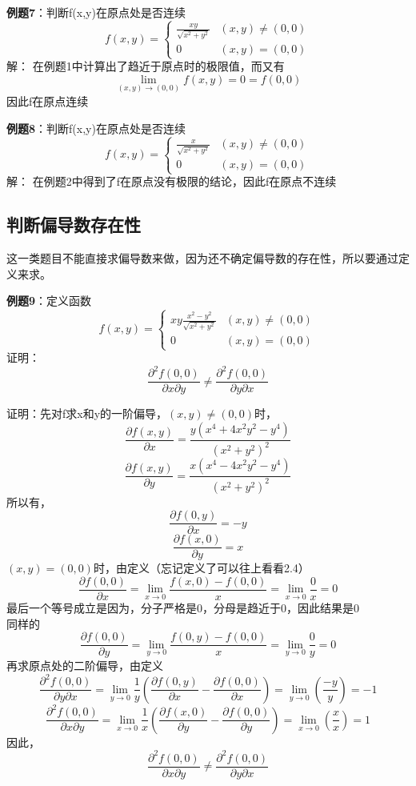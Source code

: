 \documentclass{article}
\begin{document}
\textbf{例题7}：判断f(x,y)在原点处是否连续
\[f(x,y)= \begin{cases} \frac{xy}{ \sqrt{x^2+y^2} }  & (x,y) \neq (0,0)\\0 & (x,y) = (0,0)\end{cases}\]
\quad \quad 解：
在例题1中计算出了趋近于原点时的极限值，而又有
\[\lim\limits_{(x,y) \rightarrow (0,0)}f(x,y) = 0 = f(0,0)\]
因此f在原点连续

\textbf{例题8}：判断f(x,y)在原点处是否连续
\[f(x,y)= \begin{cases} \frac{x}{ \sqrt{x^2+y^2} }  & (x,y) \neq (0,0)\\0 & (x,y) = (0,0)\end{cases}\]
\quad \quad 解：
在例题2中得到了f在原点没有极限的结论，因此f在原点不连续

\subsection{判断偏导数存在性}
这一类题目不能直接求偏导数来做，因为还不确定偏导数的存在性，所以要通过定义来求。

\textbf{例题9}：定义函数
\[f(x,y)= \begin{cases} xy\frac{x^2-y^2}{ \sqrt{x^2+y^2} }  & (x,y) \neq (0,0)\\0 & (x,y) = (0,0)\end{cases}\]
证明：
\[\frac{\partial^2 f(0,0)}{\partial x \partial y}  \neq \frac{\partial^2 f(0,0)}{\partial y \partial x}\]

证明：先对f求x和y的一阶偏导，$(x,y) \neq (0,0)$时，
\[\frac{\partial f(x,y)}{\partial x}= \frac{y(x^4+4x^2y^2-y^4)}{(x^2+y^2)^2}\]
\[\frac{\partial f(x,y)}{\partial y}= \frac{x(x^4-4x^2y^2-y^4)}{(x^2+y^2)^2}\]
所以有，
\[\frac{\partial f(0,y)}{\partial x}= -y\]
\[\frac{\partial f(x,0)}{\partial y}= x\]
$(x,y) = (0,0)$时，由定义（忘记定义了可以往上看看2.4）
\[\frac{\partial f(0,0)}{\partial x}=  \lim\limits_{x \rightarrow 0} \frac{f(x,0)-f(0,0)}{x} = \lim\limits_{x \rightarrow 0} \frac{0}{x}=0\]
最后一个等号成立是因为，分子严格是0，分母是趋近于0，因此结果是0 \\
同样的
\[\frac{\partial f(0,0)}{\partial y}=  \lim\limits_{y \rightarrow 0} \frac{f(0,y)-f(0,0)}{x} = \lim\limits_{y \rightarrow 0} \frac{0}{y}=0\]
再求原点处的二阶偏导，由定义
\[\frac{\partial^2 f(0,0)}{\partial y \partial x} = \lim\limits_{y \rightarrow 0} \frac{1}{y}\left( \frac{\partial f(0,y)}{\partial x}-\frac{\partial f(0,0)}{\partial x} \right)
= \lim\limits_{y \rightarrow 0}\left(  \frac{-y}{y}  \right)
=-1\]
\[\frac{\partial^2 f(0,0)}{\partial x \partial y} = \lim\limits_{x \rightarrow 0} \frac{1}{x}\left( \frac{\partial f(x,0)}{\partial y}-\frac{\partial f(0,0)}{\partial y} \right)
= \lim\limits_{x \rightarrow 0}\left(  \frac{x}{x}  \right)
=1\]
因此，
\[\frac{\partial^2 f(0,0)}{\partial x \partial y}  \neq \frac{\partial^2 f(0,0)}{\partial y \partial x}\]
\end{document}
